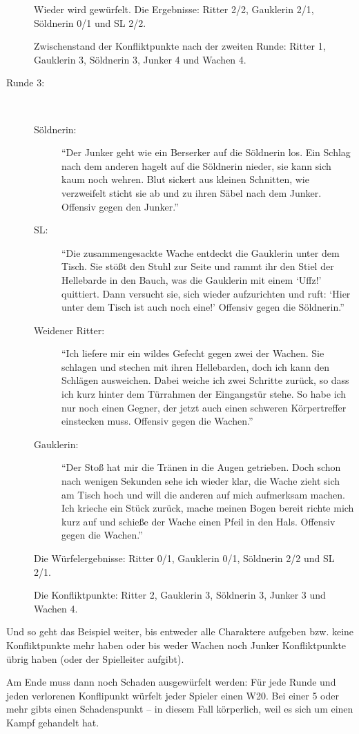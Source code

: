 \begin{description}
Wieder wird gewürfelt. Die Ergebnisse: Ritter 2/2, Gauklerin 2/1, Söldnerin 0/1 und SL 2/2.

Zwischenstand der Konfliktpunkte nach der zweiten Runde: Ritter 1, Gauklerin 3, Söldnerin 3, Junker 4 und Wachen 4.

\item[Runde 3:]~
\begin{description}
  \item[Söldnerin:] ``Der Junker geht wie ein Berserker auf die Söldnerin los. Ein Schlag nach dem anderen hagelt auf die Söldnerin nieder, sie kann sich kaum noch wehren. Blut sickert aus kleinen Schnitten, wie verzweifelt sticht sie ab und zu ihren Säbel nach dem Junker. Offensiv gegen den Junker.''
  \item[SL:] ``Die zusammengesackte Wache entdeckt die Gauklerin unter dem Tisch. Sie stößt den Stuhl zur Seite und rammt ihr den Stiel der Hellebarde in den Bauch, was die Gauklerin mit einem `Uffz!' quittiert. Dann versucht sie, sich wieder aufzurichten und ruft: `Hier unter dem Tisch ist auch noch eine!' Offensiv gegen die Söldnerin.''
  \item[Weidener Ritter:] ``Ich liefere mir ein wildes Gefecht gegen zwei der Wachen. Sie schlagen und stechen mit ihren Hellebarden, doch ich kann den Schlägen ausweichen. Dabei weiche ich zwei Schritte zurück, so dass ich kurz hinter dem Türrahmen der Eingangstür stehe. So habe ich nur noch einen Gegner, der jetzt auch einen schweren Körpertreffer einstecken muss. Offensiv gegen die Wachen.''
  \item[Gauklerin:] ``Der Stoß hat mir die Tränen in die Augen getrieben. Doch schon nach wenigen Sekunden sehe ich wieder klar, die Wache zieht sich am Tisch hoch und will die anderen auf mich aufmerksam machen. Ich krieche ein Stück zurück, mache meinen Bogen bereit richte mich kurz auf und schieße der Wache einen Pfeil in den Hals. Offensiv gegen die Wachen.''
\end{description}
Die Würfelergebnisse: Ritter 0/1, Gauklerin 0/1, Söldnerin 2/2 und SL 2/1.

Die Konfliktpunkte: Ritter 2, Gauklerin 3, Söldnerin 3, Junker 3 und Wachen 4.
\end{description}

Und so geht das Beispiel weiter, bis entweder alle Charaktere aufgeben bzw. keine Konfliktpunkte mehr haben oder bis weder Wachen noch Junker Konfliktpunkte übrig haben (oder der Spielleiter aufgibt).

Am Ende muss dann noch Schaden ausgewürfelt werden: Für jede Runde und jeden verlorenen Konflipunkt würfelt jeder Spieler einen W20. Bei einer 5 oder mehr gibts einen Schadenspunkt -- in diesem Fall körperlich, weil es sich um einen Kampf gehandelt hat.


